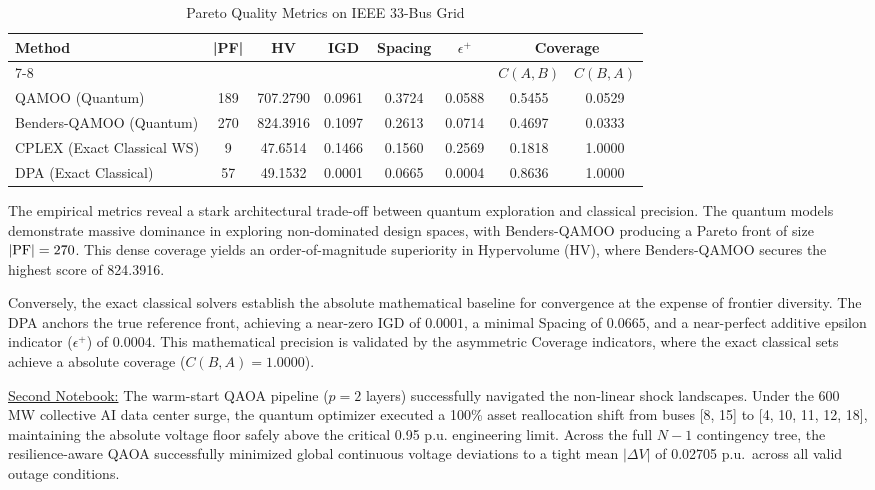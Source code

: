 \documentclass[11pt]{article}
\begin{document}
\begin{table}[h!]
\centering
\caption{Pareto Quality Metrics on IEEE 33-Bus Grid}
\vspace{0.5em}
\begin{tabular}{lccccccc}
\toprule
\textbf{Method} & |\textbf{PF}| & \textbf{HV} & \textbf{IGD} & \textbf{Spacing} & $\epsilon^+$ & \multicolumn{2}{c}{\textbf{Coverage}} \\
\cmidrule(lr){7-8}
& & & & & & $C(A,B)$ & $C(B,A)$ \\
\midrule
QAMOO (Quantum)            & 189 & 707.2790 & 0.0961 & 0.3724 & 0.0588 & 0.5455 & 0.0529 \\
Benders-QAMOO (Quantum)    & 270 & 824.3916 & 0.1097 & 0.2613 & 0.0714 & 0.4697 & 0.0333 \\
CPLEX (Exact Classical WS) & 9   & 47.6514  & 0.1466 & 0.1560 & 0.2569 & 0.1818 & 1.0000 \\
DPA (Exact Classical)      & 57  & 49.1532  & 0.0001 & 0.0665 & 0.0004 & 0.8636 & 1.0000 \\
\bottomrule
\end{tabular}
\end{table}

The empirical metrics reveal a stark architectural trade-off between quantum exploration and classical precision. The quantum models demonstrate massive dominance in exploring non-dominated design spaces, with Benders-QAMOO producing a Pareto front of size $|{\rm PF}| = 270$. This dense coverage yields an order-of-magnitude superiority in Hypervolume (HV), where Benders-QAMOO secures the highest score of 824.3916.

Conversely, the exact classical solvers establish the absolute mathematical baseline for convergence at the expense of frontier diversity. The DPA anchors the true reference front, achieving a near-zero IGD of $0.0001$, a minimal Spacing of $0.0665$, and a near-perfect additive epsilon indicator ($\epsilon^+$) of $0.0004$. This mathematical precision is validated by the asymmetric Coverage indicators, where the exact classical sets achieve a absolute coverage ($C(B,A) = 1.0000$).

\underline{Second Notebook:} The warm-start QAOA pipeline ($p=2$ layers) successfully navigated the non-linear shock landscapes. Under the 600 MW collective AI data center surge, the quantum optimizer executed a 100\% asset reallocation shift from buses [8, 15] to [4, 10, 11, 12, 18], maintaining the absolute voltage floor safely above the critical 0.95 p.u. engineering limit.  Across the full $N-1$ contingency tree, the resilience-aware QAOA successfully minimized global continuous voltage deviations to a tight mean $|\Delta V|$ of 0.02705 p.u.~across all valid outage conditions.
\end{document}
